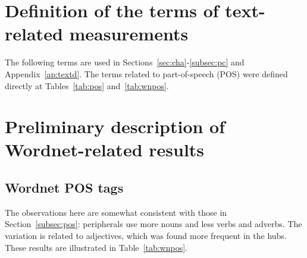 \documentclass[review]{elsarticle}
\begin{document}
\section{Definition of the terms of text-related measurements}\label{ap:msTerms}
      The following terms are used in Sections~\ref{sec:cha}-\ref{subsec:pc} and Appendix~\ref{ap:textd}.
	The terms related to part-of-speech (POS) were defined directly at Tables~\ref{tab:pos} and~\ref{tab:wnpos}.


\section{Preliminary description of Wordnet-related results}\label{awn}
\subsection{Wordnet POS tags}\label{subsec:wnpos}
The observations here are somewhat consistent with those in Section~\ref{subsec:pos}:
peripherals use more nouns and less verbs and adverbs.
The variation is related to adjectives, which was found more frequent in the hubs.
These results are illustrated in Table~\ref{tab:wnpos}.

\FloatBarrier
\end{document}
